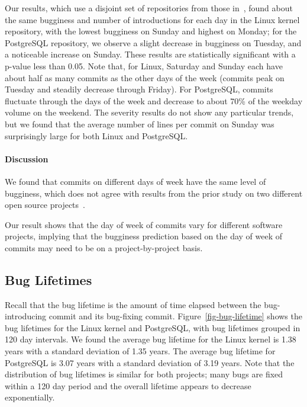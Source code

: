 Our results, which use a disjoint set of repositories from those
in~\cite{sliwerski-msr-2005}, found about the same bugginess and number of
introductions for each day in the Linux kernel repository, with the lowest
bugginess on Sunday and highest on Monday; for the PostgreSQL repository, we
observe a slight decrease in bugginess on Tuesday, and a noticeable increase on
Sunday. These results are statistically significant with a p-value less than
0.05. Note that, for Linux, Saturday and Sunday each have about half as many
commits as the other days of the week (commits peak on Tuesday and steadily
decrease through Friday). For PostgreSQL, commits fluctuate through the days of
the week and decrease to about 70\% of the weekday volume on the weekend. The
severity results do not show any particular trends, but we found that the
average number of lines per commit on Sunday was surprisingly large for both
Linux and PostgreSQL.

\paragraph{Discussion}

We found that commits on different days of week have the same level of
bugginess, which does not agree with results from the prior study on two
different open source projects~\cite{sliwerski-msr-2005}. 

Our result shows that
the day of week of commits vary for different software projects, implying that
the bugginess prediction based on the day of week of commits may need to be on a
project-by-project basis.

\subsection{Bug Lifetimes}
\label{sec-bug-lifetime}

Recall that the bug lifetime is the amount of time elapsed between the
bug-introducing commit and its bug-fixing commit.  Figure~\ref{fig-bug-lifetime}
shows the bug lifetimes for the Linux kernel and PostgreSQL, with bug lifetimes
grouped in 120 day intervals. We found the average bug lifetime for the Linux
kernel is 1.38 years with a standard deviation of 1.35 years. The average bug
lifetime for PostgreSQL is 3.07 years with a standard deviation of 3.19
years. Note that the distribution of bug lifetimes is similar for both projects;
many bugs are fixed within a 120 day period and the overall lifetime appears to
decrease exponentially.

